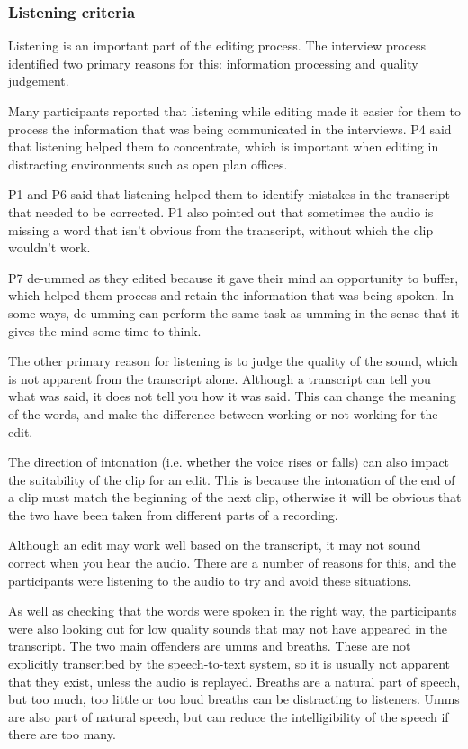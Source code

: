 \subsubsection{Listening criteria}

Listening is an important part of the editing process. The interview process identified two primary reasons for this:
information processing and quality judgement.

Many participants reported that listening while editing made it easier for them to process the information that was
being communicated in the interviews. P4 said that listening helped them to concentrate, which is important when
editing in distracting environments such as open plan offices.

P1 and P6 said that listening helped them to identify mistakes in the transcript that needed to be corrected. P1 also
pointed out that sometimes the audio is missing a word that isn't obvious from the transcript, without which the clip
wouldn't work.

P7 de-ummed as they edited because it gave their mind an opportunity to buffer, which helped them process and retain
the information that was being spoken. In some ways, de-umming can perform the same task as umming in the sense that it
gives the mind some time to think.

The other primary reason for listening is to judge the quality of the sound, which is not apparent from the transcript
alone. Although a transcript can tell you what was said, it does not tell you how it was said. This can change the
meaning of the words, and make the difference between working or not working for the edit.

The direction of intonation (i.e. whether the voice rises or falls) can also impact the suitability of the clip for an
edit. This is because the intonation of the end of a clip must match the beginning of the next clip, otherwise it will
be obvious that the two have been taken from different parts of a recording.

Although an edit may work well based on the transcript, it may not sound correct when you hear the audio. There are a
number of reasons for this, and the participants were listening to the audio to try and avoid these situations.

As well as checking that the words were spoken in the right way, the participants were also looking out for low quality
sounds that may not have appeared in the transcript. The two main offenders are umms and breaths. These are not
explicitly transcribed by the speech-to-text system, so it is usually not apparent that they exist, unless the audio is
replayed. Breaths are a natural part of speech, but too much, too little or too loud breaths can be distracting to
listeners. Umms are also part of natural speech, but can reduce the intelligibility of the speech if there are too
many.

